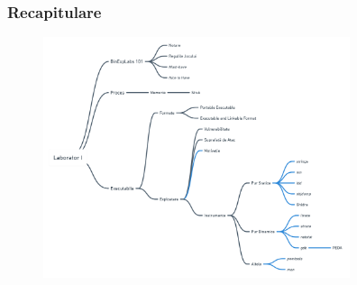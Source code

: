 \documentclass[xcolor={table}]{beamer}
\begin{document}
	\begin{frame}
		\frametitle{Recapitulare}\pause
		\begin{figure}
            \centering
            \includegraphics[width=9cm]{images/recap.png}
        \end{figure}
	\end{frame}
\end{document}
